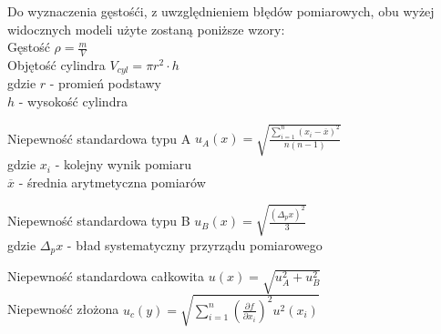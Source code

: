 \pagebreak

Do wyznaczenia gęstośći, z uwzględnieniem błędów pomiarowych, obu wyżej widocznych modeli użyte zostaną poniższe wzory: \\

Gęstość \hfill $\rho = \frac{m}{V}$ \\

Objętość cylindra \hfill $V_{cyl} = \pi r^2 \cdot h$ \\
{
\indent \qquad \small gdzie $r$ - promień podstawy \\
\indent \qquad \small $h$ - wysokość cylindra \\
}

Niepewność standardowa typu A \hfill $\displaystyle u_A(x) = \sqrt{ \frac{ \displaystyle \sum_{i=1}^{n} (x_i - \overline{x} )^2 }{ n(n - 1) } }$ \\
{
\indent \qquad \small gdzie $x_i$ - kolejny wynik pomiaru \\
\indent \qquad \small $\overline{x}$ - średnia arytmetyczna pomiarów \\
}

Niepewność standardowa typu B \hfill $\displaystyle u_B(x) = \sqrt{ \frac{ (\Delta_p x)^2 }{3} }$ \\
{
\indent \qquad \small gdzie $\Delta_p x$ - bład systematyczny przyrządu pomiarowego \\
}

Niepewność standardowa całkowita \hfill $\displaystyle u(x) = \sqrt{ u_A^2 + u_B^2 }$ \\

Niepewność złożona \hfill $\displaystyle u_c(y) = \sqrt{\displaystyle\sum_{i=1}^{n} \left( \frac{\partial f}{\partial x_i} \right)^2 u^2(x_i)} $ \\
